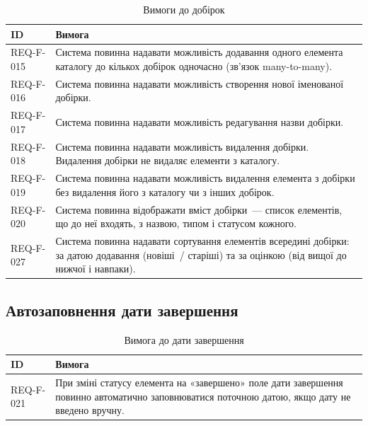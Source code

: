 \begin{table}[h]
\caption{Вимоги до добірок}
\label{tab:dobirkы}
\begin{tabular}{L{2.5cm} L{11.5cm}}
\toprule
\textbf{ID} & \textbf{Вимога} \\
\midrule
REQ-F-015 & Система повинна надавати можливість додавання одного елемента каталогу до кількох добірок одночасно (зв'язок many-to-many).  \\
\addlinespace
REQ-F-016 & Система повинна надавати можливість створення нової іменованої добірки.  \\
\addlinespace
REQ-F-017 & Система повинна надавати можливість редагування назви добірки.  \\
\addlinespace
REQ-F-018 & Система повинна надавати можливість видалення добірки. Видалення добірки не видаляє елементи з каталогу.  \\
\addlinespace
REQ-F-019 & Система повинна надавати можливість видалення елемента з добірки без видалення його з каталогу чи з інших добірок.  \\
\addlinespace
REQ-F-020 & Система повинна відображати вміст добірки~--- список елементів, що до неї входять, з назвою, типом і статусом кожного.  \\
\addlinespace
REQ-F-027 & Система повинна надавати сортування елементів всередині добірки: за датою додавання (новіші~/ старіші) та за оцінкою (від вищої до нижчої і навпаки).  \\
\bottomrule
\end{tabular}
\end{table}

\subsection{Автозаповнення дати завершення}

\begin{table}[h]
\caption{Вимога до дати завершення}
\label{tab:data}
\begin{tabular}{L{2.5cm} L{11.5cm}}
\toprule
\textbf{ID} & \textbf{Вимога} \\
\midrule
REQ-F-021 & При зміні статусу елемента на «завершено» поле дати завершення повинно автоматично заповнюватися поточною датою, якщо дату не введено вручну.  \\
\bottomrule
\end{tabular}
\end{table}

